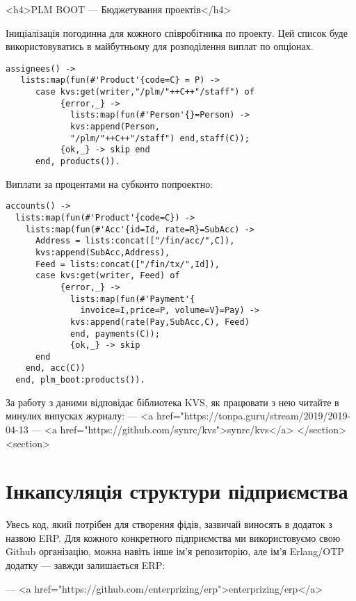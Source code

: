         <h4>PLM BOOT — Бюджетування проектів</h4>

       Іниціалізація погодинна для кожного співробітника по проекту.
          Цей список буде використовуватись в майбутньому для розподілення
          виплат по опціонах.\textbf{} 

   \begin{lstlisting}
assignees() ->
   lists:map(fun(#'Product'{code=C} = P) ->
      case kvs:get(writer,"/plm/"++C++"/staff") of
           {error,_} ->
             lists:map(fun(#'Person'{}=Person) ->
             kvs:append(Person,
             "/plm/"++C++"/staff") end,staff(C));
           {ok,_} -> skip end
      end, products()).
    \end{lstlisting}


    Виплати за процентами на субконто попроектно:

   \begin{lstlisting}
accounts() ->
  lists:map(fun(#'Product'{code=C}) ->
    lists:map(fun(#'Acc'{id=Id, rate=R}=SubAcc) ->
      Address = lists:concat(["/fin/acc/",C]),
      kvs:append(SubAcc,Address),
      Feed = lists:concat(["/fin/tx/",Id]),
      case kvs:get(writer, Feed) of
           {error,_} ->
             lists:map(fun(#'Payment'{
               invoice=I,price=P, volume=V}=Pay) ->
             kvs:append(rate(Pay,SubAcc,C), Feed)
             end, payments(C));
             {ok,_} -> skip
      end
    end, acc(C))
  end, plm_boot:products()).
    \end{lstlisting}

        За работу з даними відповідає біблиотека KVS, як працювати з нею читайте в минулих
           випусках журналу:
          — <a href="https://tonpa.guru/stream/2019/2019-04-13%
          — <a href="https://github.com/synrc/kvs">synrc/kvs</a>
    </section>
    <section>
        \section{Інкапсуляція структури підприємства}

        Увесь код, який потрібен для створення фідів, зазвичай виносять в додаток
           з назвою ERP. Для кожного конкретного підприємства ми використовуємо свою
           Github організацію, можна навіть інше ім'я репозиторію, але ім'я
           Erlang/OTP додатку — завжди залишається ERP:

          — <a href="https://github.com/enterprizing/erp">enterprizing/erp</a>

